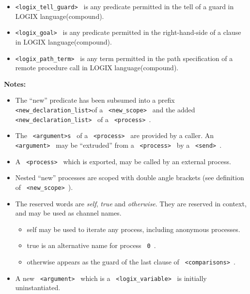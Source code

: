 \begin{itemize}
\item
\verb+<logix_tell_guard> + is any predicate permitted in the tell of a
guard in LOGIX language(compound).

\item
\verb+<logix_goal> + is any predicate permitted in the right-hand-side
of a clause in LOGIX language(compound).

\item
\verb+<logix_path_term> + is any term permitted in the path
specification of a remote procedure call in LOGIX language(compound).
\end{itemize}

\newpage

{\bf\Large Notes:}

\begin{itemize}

\item
The ``new'' predicate has been subsumed into a prefix
\verb+ <new_declaration_list>+\linebreak of a \verb+ <new_scope> +
and the added
\verb+ <new_declaration_list> + of a \verb+ <process> +.

\item
The \verb+ <argument>s + of a
\verb+ <process> + are provided by a caller. An \verb+ <argument> +
may be ``extruded'' from a \verb+ <process> + by a \verb+ <send> +.

\item
A \verb+ <process> + which is exported, may be called by an
external process.


\item
Nested ``new'' processes are scoped with double angle brackets (see
definition of \verb+ <new_scope> +).


\item
The reserved words are {\em self}, {\em true} and {\em otherwise}.
They are reserved in context, and may be used as channel names.


\begin{itemize}
\item
self may be used to iterate any process, including anonymous processes.
\item
true is an alternative name for process \verb+ 0 +.
\item
otherwise appears as the guard of the last clause of
\verb+ <comparisons> +.
\end{itemize}

\item
A  new \verb+ <argument> + which is a \verb+ <logix_variable> + is initially
uninstantiated.


\end{itemize}
